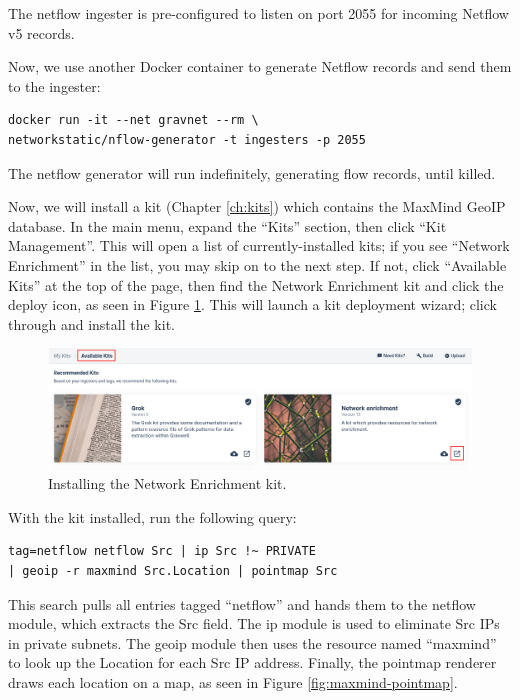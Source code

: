The netflow ingester is pre-configured to listen on port 2055 for
incoming Netflow v5 records.

Now, we use another Docker container to generate Netflow records and
send them to the ingester:

\begin{Verbatim}[breaklines=true]
docker run -it --net gravnet --rm \
networkstatic/nflow-generator -t ingesters -p 2055
\end{Verbatim}

The netflow generator will run indefinitely, generating flow records,
until killed.

Now, we will install a kit (Chapter \ref{ch:kits}) which contains the MaxMind GeoIP database. In the main menu, expand the ``Kits'' section, then click ``Kit Management''. This will open a list of currently-installed kits; if you see ``Network Enrichment'' in the list, you may skip on to the next step. If not, click ``Available Kits'' at the top of the page, then find the Network Enrichment kit and click the deploy icon, as seen in Figure \ref{fig:maxmind-upload}. This will launch a kit deployment wizard; click through and install the kit.

\begin{figure}
	\includegraphics[width=0.8\linewidth]{images/maxmind-upload.png}
	\caption{Installing the Network Enrichment kit.}
	\label{fig:maxmind-upload}
\end{figure}

With the kit installed, run the following query:

\begin{Verbatim}[breaklines=true]
tag=netflow netflow Src | ip Src !~ PRIVATE
| geoip -r maxmind Src.Location | pointmap Src
\end{Verbatim}

This search pulls all entries tagged ``netflow'' and hands them to the
netflow module, which extracts the Src field. The ip module is used to
eliminate Src IPs in private subnets. The geoip module then uses the
resource named ``maxmind'' to look up the Location for each Src IP
address. Finally, the pointmap renderer draws each location on a map, as
seen in Figure \ref{fig:maxmind-pointmap}.

